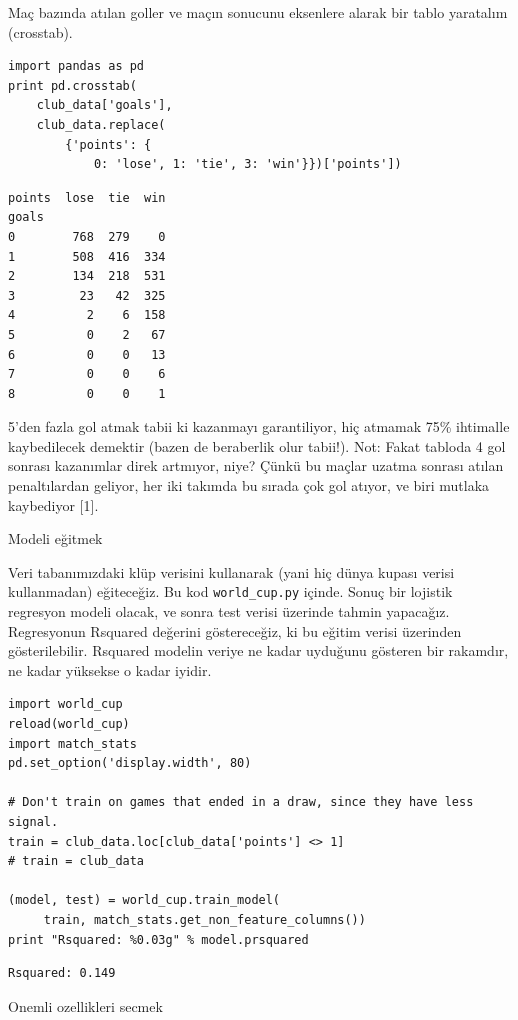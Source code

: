 \documentclass[12pt,fleqn]{article}\usepackage{../../common}
\begin{document}
Maç bazında atılan goller ve maçın sonucunu eksenlere alarak bir tablo
yaratalım (crosstab).

\begin{verbatim}
import pandas as pd
print pd.crosstab(
    club_data['goals'], 
    club_data.replace(
        {'points': {
            0: 'lose', 1: 'tie', 3: 'win'}})['points'])
\end{verbatim}

\begin{verbatim}
points  lose  tie  win
goals                 
0        768  279    0
1        508  416  334
2        134  218  531
3         23   42  325
4          2    6  158
5          0    2   67
6          0    0   13
7          0    0    6
8          0    0    1
\end{verbatim}

5'den fazla gol atmak tabii ki kazanmayı garantiliyor, hiç atmamak 75\%
ihtimalle kaybedilecek demektir (bazen de beraberlik olur tabii!). Not:
Fakat tabloda 4 gol sonrası kazanımlar direk artmıyor, niye? Çünkü bu
maçlar uzatma sonrası atılan penaltılardan geliyor, her iki takımda bu
sırada çok gol atıyor, ve biri mutlaka kaybediyor [1].

Modeli eğitmek

Veri tabanımızdaki klüp verisini kullanarak (yani hiç dünya kupası verisi
kullanmadan) eğiteceğiz. Bu kod  \verb!world_cup.py! içinde. Sonuç bir
lojistik regresyon modeli olacak, ve sonra test verisi üzerinde tahmin
yapacağız. Regresyonun Rsquared değerini göstereceğiz, ki bu eğitim
verisi üzerinden gösterilebilir. Rsquared modelin veriye ne kadar uyduğunu
gösteren bir rakamdır, ne kadar yüksekse o kadar iyidir.

\begin{verbatim}
import world_cup
reload(world_cup)
import match_stats
pd.set_option('display.width', 80)

# Don't train on games that ended in a draw, since they have less signal.
train = club_data.loc[club_data['points'] <> 1] 
# train = club_data

(model, test) = world_cup.train_model(
     train, match_stats.get_non_feature_columns())
print "Rsquared: %0.03g" % model.prsquared
\end{verbatim}

\begin{verbatim}
Rsquared: 0.149
\end{verbatim}

Onemli ozellikleri secmek
\end{document}
